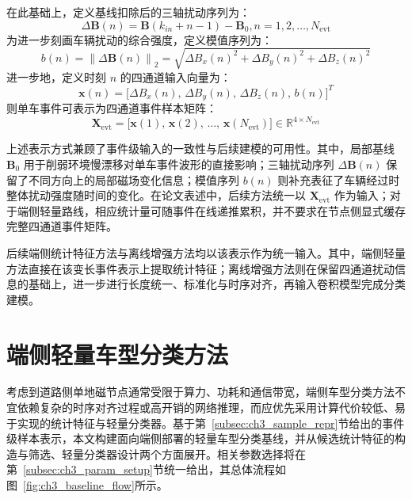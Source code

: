 \documentclass{xdupgthesis}
\begin{document}
在此基础上，定义基线扣除后的三轴扰动序列为：
\begin{equation}
    \Delta\mathbf{B}(n)=\mathbf{B}(k_{in}+n-1)-\mathbf{B}_0, n=1,2,\ldots,N_{\mathrm{evt}}
\end{equation}
为进一步刻画车辆扰动的综合强度，定义模值序列为：
\begin{equation}
    b(n)=\left\|\Delta\mathbf{B}(n)\right\|_2
    =\sqrt{\Delta B_x(n)^2+\Delta B_y(n)^2+\Delta B_z(n)^2}
\end{equation}
进一步地，定义时刻 $n$ 的四通道输入向量为：
\begin{equation}
    \mathbf{x}(n)=\big[\Delta B_x(n),\,\Delta B_y(n),\,\Delta B_z(n),\,b(n)\big]^T
\end{equation}
则单车事件可表示为四通道事件样本矩阵：
\begin{equation}
    \mathbf{X}_{\mathrm{evt}}=
    \big[\mathbf{x}(1),\,\mathbf{x}(2),\,\ldots,\,\mathbf{x}(N_{\mathrm{evt}})\big]
    \in \mathbb{R}^{4\times N_{\mathrm{evt}}}
\end{equation}

上述表示方式兼顾了事件级输入的一致性与后续建模的可用性。其中，局部基线 $\mathbf{B}_0$ 用于削弱环境慢漂移对单车事件波形的直接影响；三轴扰动序列 $\Delta\mathbf{B}(n)$ 保留了不同方向上的局部磁场变化信息；模值序列 $b(n)$ 则补充表征了车辆经过时整体扰动强度随时间的变化。在论文表述中，后续方法统一以 $\mathbf{X}_{\mathrm{evt}}$ 作为输入；对于端侧轻量路线，相应统计量可随事件在线递推累积，并不要求在节点侧显式缓存完整四通道事件矩阵。

后续端侧统计特征方法与离线增强方法均以该表示作为统一输入。其中，端侧轻量方法直接在该变长事件表示上提取统计特征；离线增强方法则在保留四通道扰动信息的基础上，进一步进行长度统一、标准化与时序对齐，再输入卷积模型完成分类建模。


\section{端侧轻量车型分类方法}
\label{sec:ch3_edge}

考虑到道路侧单地磁节点通常受限于算力、功耗和通信带宽，端侧车型分类方法不宜依赖复杂的时序对齐过程或高开销的网络推理，而应优先采用计算代价较低、易于实现的统计特征与轻量分类器\cite{ch5_ray2022tinyml,wang2023edge_review}。基于第~\ref{subsec:ch3_sample_repr}节给出的事件级样本表示，本文构建面向端侧部署的轻量车型分类基线，并从候选统计特征的构造与筛选、轻量分类器设计两个方面展开。相关参数选择将在第~\ref{subsec:ch3_param_setup}节统一给出，其总体流程如图~\ref{fig:ch3_baseline_flow}所示。
\end{document}
